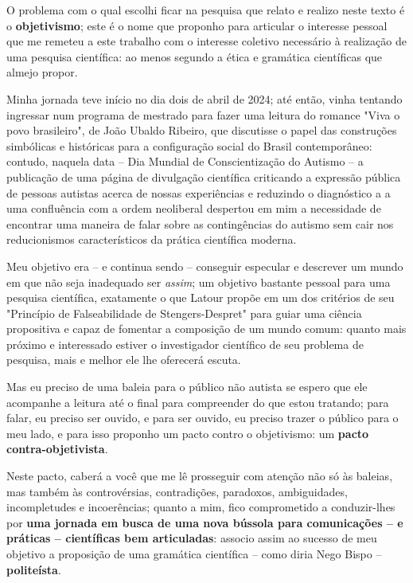 O problema com o qual escolhi ficar na pesquisa que relato e realizo neste texto é o \textbf{objetivismo};
    este é o nome que proponho para articular o interesse pessoal que me remeteu a este trabalho com o interesse coletivo necessário à realização de uma pesquisa científica:
        ao menos segundo a ética e gramática científicas que almejo propor.

Minha jornada teve início no dia dois de abril de 2024;
    até então, vinha tentando ingressar num programa de mestrado para fazer uma leitura do romance "Viva o povo brasileiro", de João Ubaldo Ribeiro, que discutisse o papel das construções simbólicas e históricas para a configuração social do Brasil contemporâneo:
        contudo, naquela data -- Dia Mundial de Conscientização do Autismo -- a publicação de uma página de divulgação científica criticando a expressão pública de pessoas autistas acerca de nossas experiências e reduzindo o diagnóstico a a uma confluência com a ordem neoliberal despertou em mim a necessidade de encontrar uma maneira de falar sobre as contingências do autismo sem cair nos reducionismos característicos da prática científica moderna.

Meu objetivo era -- e continua sendo -- conseguir especular e descrever um mundo em que não seja inadequado ser \textit{assim};
    um objetivo bastante pessoal para uma pesquisa científica, exatamente o que Latour propõe em um dos critérios de seu "Princípio de Falseabilidade de Stengers-Despret" para guiar uma ciência propositiva e capaz de fomentar a composição de um mundo comum:
        quanto mais próximo e interessado estiver o investigador científico de seu problema de pesquisa, mais e melhor ele lhe oferecerá escuta.

Mas eu preciso de uma baleia para o público não autista se espero que ele acompanhe a leitura até o final para compreender do que estou tratando;
    para falar, eu preciso ser ouvido, e para ser ouvido, eu preciso trazer o público para o meu lado, e para isso proponho um pacto contro o objetivismo:
        um \textbf{pacto contra-objetivista}.

Neste pacto, caberá a você que me lê prosseguir com atenção não só às baleias, mas também às controvérsias, contradições, paradoxos, ambiguidades, incompletudes e incoerências;
    quanto a mim, fico comprometido a conduzir-lhes por \textbf{uma jornada em busca de uma nova bússola para comunicações -- e práticas -- científicas bem articuladas}:
        associo assim ao sucesso de meu objetivo a proposição de uma gramática científica -- como diria Nego Bispo -- \textbf{politeísta}.

